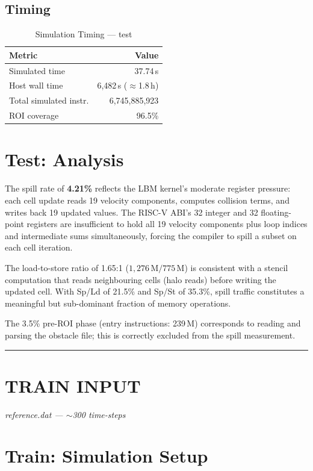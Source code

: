 \documentclass[conference]{IEEEtran}
\newcommand{\inputpart}[2]{%
    \vspace{1em}
    \noindent\rule{\linewidth}{0.4pt}
    \section{#1}
    \textit{#2}
    \vspace{0.2em}
}
\begin{document}
\subsection{Timing}

\begin{table}[H]
\centering
\caption{Simulation Timing --- test}
\label{tab:test_timing}
\begin{tabular}{lr}
\toprule
\textbf{Metric} & \textbf{Value} \\
\midrule
Simulated time           & 37.74\,s \\
Host wall time           & 6,482\,s ($\approx$1.8\,h) \\
Total simulated instr.   & 6,745,885,923 \\
ROI coverage             & 96.5\% \\
\bottomrule
\end{tabular}
\end{table}

\section{Test: Analysis}

The spill rate of \textbf{4.21\%} reflects the LBM kernel's
moderate register pressure: each cell update reads 19 velocity
components, computes collision terms, and writes back 19 updated
values.  The RISC-V ABI's 32 integer and 32 floating-point registers
are insufficient to hold all 19 velocity components plus loop indices
and intermediate sums simultaneously, forcing the compiler to spill a
subset on each cell iteration.

The load-to-store ratio of 1.65:1 ($1{,}276\,\text{M} / 775\,\text{M}$)
is consistent with a stencil computation that reads neighbouring cells
(halo reads) before writing the updated cell.  With Sp/Ld of 21.5\%
and Sp/St of 35.3\%, spill traffic constitutes a meaningful but
sub-dominant fraction of memory operations.

The 3.5\% pre-ROI phase (entry instructions: 239\,M) corresponds to
reading and parsing the obstacle file; this is correctly excluded from
the spill measurement.

\inputpart{TRAIN INPUT}{reference.dat --- $\sim$300 time-steps}

\section{Train: Simulation Setup}
\end{document}

